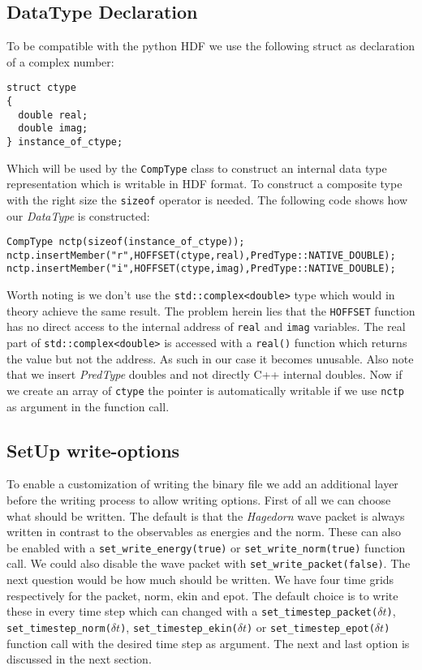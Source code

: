 \documentclass{article}
\begin{document}
\subsection{DataType Declaration}
To be compatible with the python HDF we use the following struct as declaration of a complex number:
\begin{lstlisting}
struct ctype
{
  double real;
  double imag;
} instance_of_ctype;
\end{lstlisting}
Which will be used by the \texttt{CompType} class to construct an internal data type representation which is writable in HDF format. To construct a composite type with the right size the \texttt{sizeof} operator is needed. The following code shows how our \textit{DataType} is constructed:
\begin{lstlisting}
CompType nctp(sizeof(instance_of_ctype));
nctp.insertMember("r",HOFFSET(ctype,real),PredType::NATIVE_DOUBLE);
nctp.insertMember("i",HOFFSET(ctype,imag),PredType::NATIVE_DOUBLE);
\end{lstlisting}
Worth noting is we don't use the \texttt{std::complex<double>} type which would in theory achieve the same result. The problem herein lies that the \texttt{HOFFSET} function has no direct access to the internal address of \texttt{real} and \texttt{imag} variables. The real part of \texttt{std::complex<double>} is accessed with a \texttt{real()} function which returns the value but not the address. As such in our case it becomes unusable. Also note that we insert \textit{PredType} doubles and not directly C++ internal doubles. Now if we create an array of \texttt{ctype} the pointer is automatically writable if we use \texttt{nctp} as argument in the function call.

\subsection{SetUp write-options}
To enable a customization of writing the binary file we add an additional layer before the writing process to allow writing options. First of all we can choose what should be written. The default is that the \textit{Hagedorn} wave packet is always written in contrast to the observables as energies and the norm. These can also be enabled with a \texttt{set\_write\_energy(true)} or \texttt{set\_write\_norm(true)} function call. We could also disable the wave packet with \texttt{set\_write\_packet(false)}. The next question would be how much should be written. We have four time grids respectively for the packet, norm, ekin and epot. The default choice is to write these in every time step which can changed with a \texttt{set\_timestep\_packet($\delta t$)}, \texttt{set\_timestep\_norm($\delta t$)}, \texttt{set\_timestep\_ekin($\delta t$)} or \texttt{set\_timestep\_epot($\delta t$)} function call with the desired time step as argument. The next and last option is discussed in the next section. 
\end{document}
